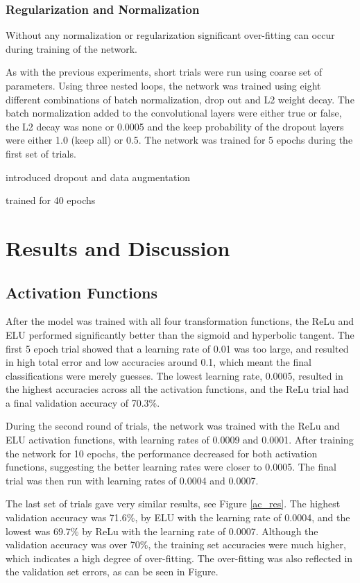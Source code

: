 \documentclass[]{article}
\begin{document}
\subsubsection{Regularization and Normalization}

Without any normalization or regularization significant over-fitting can occur during training of the network. 

As with the previous experiments, short trials were run using coarse set of parameters. Using three nested loops, the network was trained using eight different combinations of batch normalization, drop out and L2 weight decay. The batch normalization added to the convolutional layers were either true or false, the L2 decay was none or 0.0005 and the keep probability of the dropout layers were either 1.0 (keep all) or 0.5. The network was trained for 5 epochs during the first set of trials. 



introduced dropout and data augmentation

trained for 40 epochs
 
 
\section{Results and Discussion}

\subsection{Activation Functions}

After the model was trained with all four transformation functions, the ReLu and ELU performed significantly better than the sigmoid and hyperbolic tangent. The first 5 epoch trial showed that a learning rate of 0.01 was too large, and resulted in high total error and low accuracies around 0.1, which meant the final classifications were merely guesses. The lowest learning rate, 0.0005, resulted in the highest accuracies across all the activation functions, and the ReLu trial had a final validation accuracy of 70.3\%. 

During the second round of trials, the network was trained with the ReLu and ELU activation functions, with learning rates of 0.0009 and 0.0001. After training the network for 10 epochs, the performance decreased for both activation functions, suggesting the better learning rates were closer to 0.0005. The final trial was then run with learning rates of 0.0004 and 0.0007. 

The last set of trials gave very similar results, see Figure \ref{ac_res}. The highest validation accuracy was 71.6\%, by ELU with the learning rate of 0.0004, and the lowest was 69.7\% by ReLu with the learning rate of 0.0007. Although the validation accuracy was over 70\%, the training set accuracies were much higher, which indicates a high degree of over-fitting. The over-fitting was also reflected in the validation set errors, as can be seen in Figure. 
\end{document}
